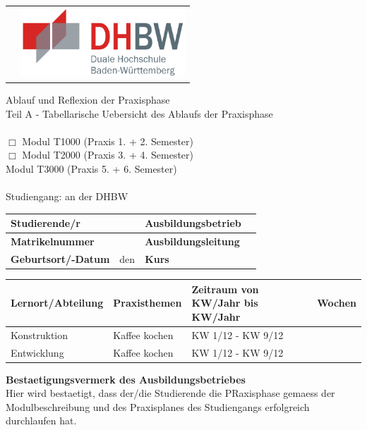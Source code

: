 	\begin{longtable}{p{} p{}}
	 & {\includegraphics[height=2.6cm]{images/dhbw.png}}
	\end{longtable}
	\enlargethispage{20mm}
	Ablauf und Reflexion der Praxisphase\\
	Teil A - Tabellarische Uebersicht des Ablaufs der Praxisphase\\
	\vspace*{2mm}\\
	$\Box$ Modul T1000 (Praxis 1. + 2. Semester)\\
	$\Box$ Modul T2000 (Praxis 3. + 4. Semester)\\
	\checkmark Modul T3000 (Praxis 5. + 6. Semester)\\
	\vspace*{2mm}\\
	Studiengang: \studiengang{} an der DHBW \dhbw\\

	\begin{tabular}{|p{3.5cm}|p{4cm}|p{4cm}|p{4cm}|}
	\hline
	\textbf{Studierende/r} & \autor & \textbf{Ausbildungsbetrieb} & \ausbildungsbetrieb \\
	\hline
	\textbf{Matrikelnummer} & \matrikelnr & \textbf{Ausbildungsleitung} & \ausbildungsleitung \\
	\hline
	\textbf{Geburtsort/-Datum} & \gebort{} den \gebdatum & \textbf{Kurs} & \kurs \\
	\hline
	\end{tabular}

	\begin{tabular}{|p{4cm}|p{7.9cm}|p{1.9cm}|p{1.7cm}|}
		\hline
		\textbf{Lernort/Abteilung} & \textbf{Praxisthemen} & \textbf{Zeitraum} \tiny{von KW/Jahr bis KW/Jahr} & \textbf{Wochen} \\
		\hline
		Konstruktion & Kaffee kochen & KW 1/12 - KW 9/12 & \zeitraumA \\
		\hline
		Entwicklung & Kaffee kochen & KW 1/12 - KW 9/12 & \zeitraumB \\
		\hline
	\end{tabular}

\textbf{Bestaetigungsvermerk des Ausbildungsbetriebes}\\
Hier wird bestaetigt, dass der/die Studierende die PRaxisphase gemaess der Modulbeschreibung und des Praxisplanes des Studiengangs erfolgreich durchlaufen hat.\\

